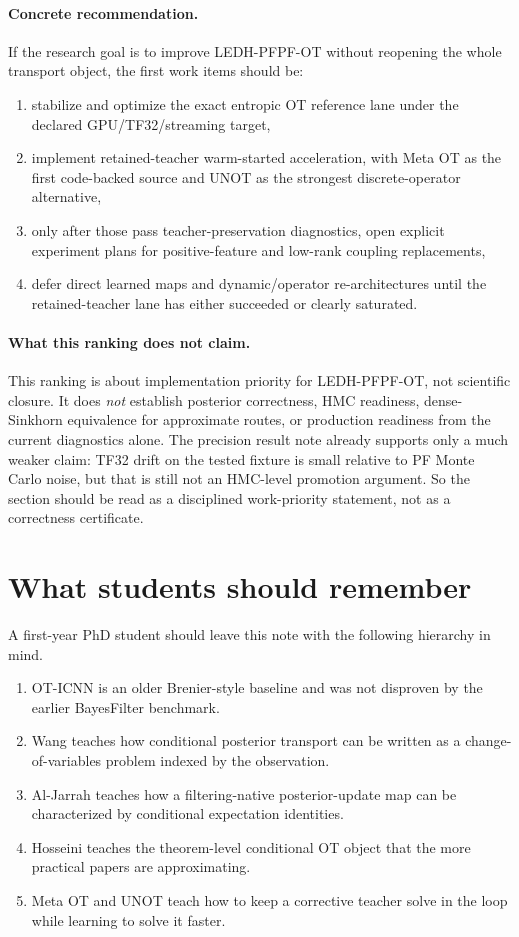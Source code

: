 \documentclass[11pt]{report}
\begin{document}
\paragraph{Concrete recommendation.}
If the research goal is to improve LEDH-PFPF-OT without reopening the whole transport
object, the first work items should be:
\begin{enumerate}[label=(\arabic*)]
  \item stabilize and optimize the exact entropic OT reference lane under the declared GPU/TF32/streaming target,
  \item implement retained-teacher warm-started acceleration, with Meta OT as the first code-backed source and UNOT as the strongest discrete-operator alternative,
  \item only after those pass teacher-preservation diagnostics, open explicit experiment plans for positive-feature and low-rank coupling replacements,
  \item defer direct learned maps and dynamic/operator re-architectures until the retained-teacher lane has either succeeded or clearly saturated.
\end{enumerate}

\paragraph{What this ranking does not claim.}
This ranking is about implementation priority for LEDH-PFPF-OT, not scientific
closure.  It does \emph{not} establish posterior correctness, HMC readiness, dense-
Sinkhorn equivalence for approximate routes, or production readiness from the current
diagnostics alone.  The precision result note already supports only a much weaker
claim: TF32 drift on the tested fixture is small relative to PF Monte Carlo noise,
but that is still not an HMC-level promotion argument.  So the section should be read
as a disciplined work-priority statement, not as a correctness certificate.

\section{What students should remember}

A first-year PhD student should leave this note with the following hierarchy in
mind.
\begin{enumerate}[label=(\arabic*)]
  \item OT-ICNN is an older Brenier-style baseline and was not disproven by the
  earlier BayesFilter benchmark.
  \item Wang teaches how conditional posterior transport can be written as a
  change-of-variables problem indexed by the observation.
  \item Al-Jarrah teaches how a filtering-native posterior-update map can be
  characterized by conditional expectation identities.
  \item Hosseini teaches the theorem-level conditional OT object that the more
  practical papers are approximating.
  \item Meta OT and UNOT teach how to keep a corrective teacher solve in the loop
  while learning to solve it faster.
\end{enumerate}
\end{document}
